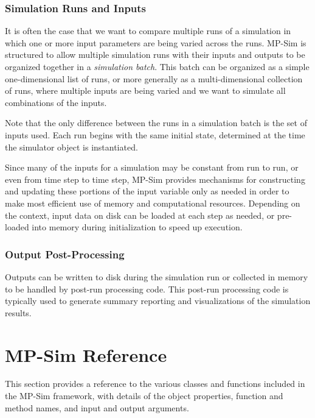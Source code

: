\documentclass[12pt]{article}
\newcommand{\mpsim}[0]{{MP-Sim}}
\numberwithin{equation}{section}
\numberwithin{table}{section}
\numberwithin{figure}{section}
\begin{document}
\subsubsection{Simulation Runs and Inputs}

It is often the case that we want to compare multiple runs of a simulation in which one or more input parameters are being varied across the runs. \mpsim{} is structured to allow multiple simulation runs with their inputs and outputs to be organized together in a \emph{simulation batch}. This batch can be organized as a simple one-dimensional list of runs, or more generally as a multi-dimensional collection of runs, where multiple inputs are being varied and we want to simulate all combinations of the inputs.

Note that the only difference between the runs in a simulation batch is the set of inputs used. Each run begins with the same initial state, determined at the time the simulator object is instantiated.

Since many of the inputs for a simulation may be constant from run to run, or even from time step to time step, \mpsim{} provides mechanisms for constructing and updating these portions of the input variable only as needed in order to make most efficient use of memory and computational resources. Depending on the context, input data on disk can be loaded at each step as needed, or pre-loaded into memory during initialization to speed up execution.

\subsubsection{Output Post-Processing}

Outputs can be written to disk during the simulation run or collected in memory to be handled by post-run processing code. This post-run processing code is typically used to generate summary reporting and visualizations of the simulation results.


\clearpage
\section{\mpsim{} Reference}
\label{sec:mpsim_ref}

This section provides a reference to the various classes and functions included in the \mpsim{} framework, with details of the object properties, function and method names, and input and output arguments.
\end{document}
